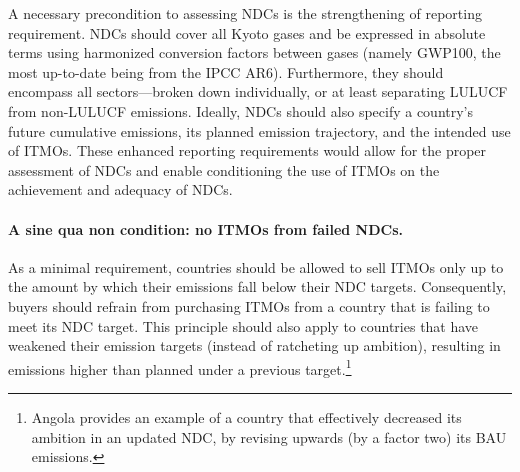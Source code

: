 \documentclass[12pt,english]{article}
\begin{document}
A necessary precondition to assessing NDCs is the strengthening of reporting requirement. NDCs should cover all Kyoto gases and be expressed in absolute terms using harmonized conversion factors between gases (namely GWP100, the most up-to-date being from the IPCC AR6). Furthermore, they should encompass all sectors---broken down individually, or at least separating LULUCF from non-LULUCF emissions. Ideally, NDCs should also specify a country's future cumulative emissions, its planned emission trajectory, and the intended use of ITMOs. These enhanced reporting requirements would allow for the proper assessment of NDCs and enable conditioning the use of ITMOs on the achievement and adequacy of NDCs. 

\paragraph{A sine qua non condition: no ITMOs from failed NDCs.} %
As a minimal requirement, countries should be allowed to sell ITMOs only up to the amount by which their emissions fall below their NDC targets. Consequently, buyers should refrain from purchasing ITMOs from a country that is failing to meet its NDC target. %
This principle should also apply to countries that have weakened their emission targets (instead of ratcheting up ambition), resulting in emissions higher than planned under a previous target.\footnote{Angola provides an example of a country that effectively decreased its ambition in an updated NDC, 
by revising upwards (by a factor two) its BAU emissions.}
\end{document}
